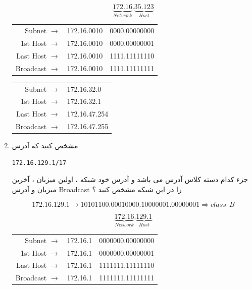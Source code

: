 \documentclass{article}
\begin{document}
\begin{enumerate}
\begin{tcolorbox}
$$
\underbrace{172.16}_{Network}.\underbrace{35.123}_{Host}
$$


\begin{latin}
\begin{center}
  \begin{tabular}{ r  r | l  }
    Subnet $\to$ & 172.16.0010 & 0000.00000000 \\
    1st Host $\to$ & 172.16.0010 & 0000.00000001 \\
    Last Host $\to$ & 172.16.0010 & 1111.11111110 \\
    Broadcast $\to$ & 172.16.0010 & 1111.11111111 \\
  \end{tabular}
\end{center}
\end{latin}


\begin{latin}
\begin{center}
  \begin{tabular}{ r  l   }
    Subnet $\to$ & 172.16.32.0  \\
    1st Host $\to$ & 172.16.32.1  \\
    Last Host $\to$ & 172.16.47.254 \\
    Broadcast $\to$ & 172.16.47.255 \\
  \end{tabular}
\end{center}
\end{latin}

\end{tcolorbox}

\newpage

\item مشخص کنید که آدرس 
\begin{lstlisting}
172.16.129.1/17
\end{lstlisting}
جزء کدام دسته کلاس آدرس می باشد و آدرس خود شبکه ، اولین میزبان ، آخرین میزبان و آدرس Broadcast را در این شبکه مشخص کنید ؟

\begin{tcolorbox}
$$
172.16.129.1 \to 10101100.00010000.10000001.00000001 \Rightarrow class \:\: B
$$


$$
\underbrace{172.16}_{Network}.\underbrace{129.1}_{Host}
$$



\begin{latin}
\begin{center}
  \begin{tabular}{ r  r | l  }
    Subnet $\to$ & 172.16.1 & 0000000.00000000 \\
    1st Host $\to$ & 172.16.1 & 0000000.00000001 \\
    Last Host $\to$ & 172.16.1 & 1111111.11111110 \\
    Broadcast $\to$ & 172.16.1 & 1111111.11111111 \\
  \end{tabular}
\end{center}
\end{latin}




\end{tcolorbox}
\end{enumerate}
\end{document}
